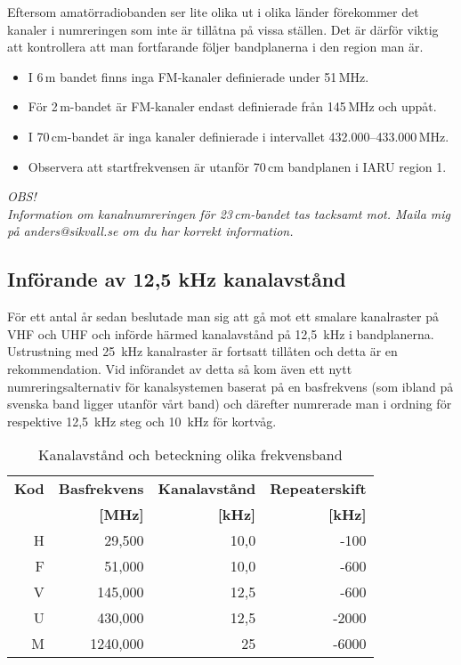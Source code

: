 {Eftersom amatörradiobanden ser lite olika ut i olika länder förekommer det
kanaler i numreringen som inte är tillåtna på vissa ställen. Det är därför
viktig att kontrollera att man fortfarande följer bandplanerna i den region
man är.

\begin{itemize}
\item I 6\,m bandet finns inga FM-kanaler definierade under 51\,MHz.
\item För 2\,m-bandet är FM-kanaler endast definierade från 145\,MHz och
uppåt.
\item I 70\,cm-bandet är inga kanaler definierade i intervallet
432.000--433.000\,MHz.
\item Observera att startfrekvensen är utanför 70\,cm
bandplanen i IARU region 1.
\end{itemize}

\textit{OBS!\\ Information om kanalnumreringen för 23\,cm-bandet tas tacksamt
mot. Maila mig på anders@sikvall.se om du har korrekt information.}

\subsection{Införande av 12,5 kHz kanalavstånd}

För ett antal år sedan beslutade man sig att gå mot ett smalare kanalraster på
VHF och UHF och införde härmed kanalavstånd på 12,5~kHz i bandplanerna.
Ustrustning med 25~kHz kanalraster är fortsatt tillåten och detta är en
rekommendation. Vid införandet av detta så kom även ett nytt
numreringsalternativ för kanalsystemen baserat på en basfrekvens (som ibland
på svenska band ligger utanför vårt band) och därefter numrerade man i ordning
för respektive 12,5~kHz steg och 10~kHz för kortvåg.

\begin{table}[h]
\centering
\begin{tabular}{rrrr}
	\bf Kod & \bf Basfrekvens & \bf Kanalavstånd & \bf Repeaterskift \\
	        &      \bf  [MHz] &        \bf [kHz] &         \bf [kHz] \\ \hline
	      H &          29,500 &             10,0 &              -100 \\
	      F &          51,000 &             10,0 &              -600 \\
	      V &         145,000 &             12,5 &              -600 \\
	      U &         430,000 &             12,5 &             -2000 \\
	      M &        1240,000 &               25 &             -6000
\end{tabular}
\label{tab:kanalavstand}
\caption{Kanalavstånd och beteckning olika frekvensband}
\end{table}

}
